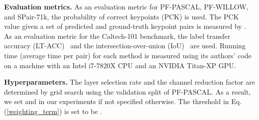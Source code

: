\documentclass[runningheads]{llncs}
\begin{document}
\smallbreak
\noindent \textbf{Evaluation metrics.} As an evaluation metric for PF-PASCAL, PF-WILLOW, and SPair-71k, the probability of correct keypoints (PCK) is used. The PCK value given a set of predicted and ground-truth keypoint pairs  is measured by .
As an evaluation metric for the Caltech-101 benchmark, the label transfer accuracy (LT-ACC)~\cite{liu2009nonparam} and the  intersection-over-union (IoU)~\cite{Everingham2010} are used. 
Running time (average time per pair) for each method is measured using its authors' code on a machine with an Intel i7-7820X CPU and an NVIDIA Titan-XP GPU.

\smallbreak
\noindent \textbf{Hyperparameters.} The layer selection rate  and the channel reduction factor  are determined by grid search using the validation split of PF-PASCAL. As a result, we set  and  in our experiments if not specified otherwise.
The threshold  in Eq.(\ref{weighting_term}) is set to be  .
\end{document}

